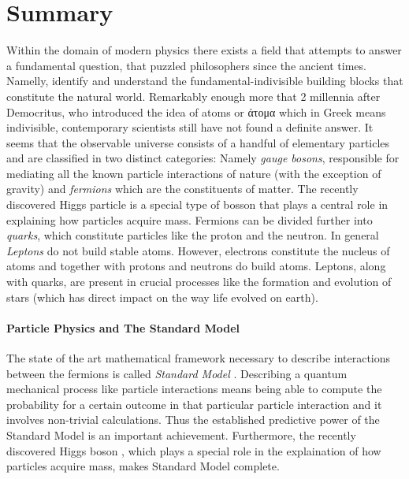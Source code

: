 \chapter*{Summary}
\chaptermark{}
%

Within the domain of modern physics there exists a field that attempts to answer a
fundamental question, that puzzled philosophers since the ancient times.
Namelly, identify and understand the fundamental-indivisible building blocks that constitute the natural world.
Remarkably enough more that 2 millennia after Democritus, who introduced
the idea of atoms or \textgreek{άτομα} which in Greek means indivisible,
contemporary scientists still have not found a definite answer.
It seems that the observable universe consists of a handful of elementary particles and are
classified in two distinct categories: Namely {\it gauge bosons}, responsible for mediating all
the known particle interactions of nature (with the exception of gravity) and {\it fermions}
which are the constituents of matter. The recently discovered Higgs particle \cite{higgs-cms,higgs-atlas}
is a special type of bosson that plays a central role in explaining how particles acquire mass.
Fermions can be divided further into {\it quarks}, which constitute particles like the proton and the neutron.
In general {\it Leptons} do not build stable atoms. However, electrons constitute the nucleus of atoms
and together with protons and neutrons do build atoms. Leptons, along with quarks, are present in crucial processes
like the formation and evolution of stars (which has direct impact on the way life evolved on earth).


\subsubsection{Particle Physics and The Standard Model}
The state of the art mathematical framework necessary to describe interactions between the
fermions is called \textit{Standard Model} \cite{sm-glashow,sm-weinberg,sm-salam}.
Describing a quantum mechanical process like particle interactions means being able
to compute the probability for a certain outcome in that particular particle interaction
and it involves non-trivial calculations. Thus the established predictive power of
the Standard Model is an important achievement. Furthermore, the recently
discovered Higgs boson \cite{higgs-cms,higgs-atlas}, which plays a special role in
the explaination of how particles acquire mass, makes Standard Model complete.

